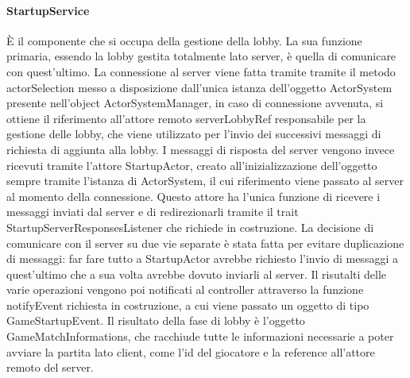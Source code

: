 \paragraph{StartupService}
È il componente che si occupa della gestione della lobby.
La sua funzione primaria, essendo la lobby gestita totalmente lato server, è quella di comunicare con quest’ultimo.
La connessione al server viene fatta tramite tramite il metodo actorSelection messo a disposizione dall’unica istanza dell’oggetto ActorSystem presente nell’object ActorSystemManager, in caso di connessione avvenuta, si ottiene il riferimento all’attore remoto serverLobbyRef responsabile per la gestione delle lobby, che viene utilizzato per l’invio dei successivi messaggi di richiesta di aggiunta alla lobby.
I messaggi di risposta del server vengono invece ricevuti tramite l’attore StartupActor, creato all’inizializzazione dell’oggetto sempre tramite l’istanza di ActorSystem, il cui riferimento viene passato al server al momento della connessione.
Questo attore ha l’unica funzione di ricevere i messaggi inviati dal server e di redirezionarli tramite il trait StartupServerResponsesListener che richiede in costruzione.
La decisione di comunicare con il server su due vie separate è stata fatta per evitare duplicazione di messaggi: far fare tutto a StartupActor avrebbe richiesto l’invio di messaggi a quest’ultimo che a sua volta avrebbe dovuto inviarli al server.
Il risutalti delle varie operazioni vengono poi notificati al controller attraverso la funzione notifyEvent richiesta in costruzione, a cui viene passato un oggetto di tipo GameStartupEvent.
Il risultato della fase di lobby è l’oggetto GameMatchInformations, che racchiude tutte le informazioni necessarie a poter avviare la partita lato client, come l'id del giocatore e la reference all'attore remoto del server.

